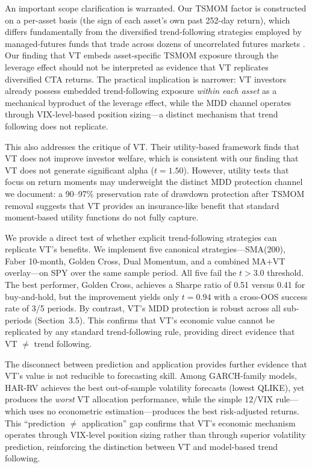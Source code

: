 \documentclass[12pt,a4paper]{article}
\begin{document}
An important scope clarification is warranted. Our TSMOM factor is constructed on a per-asset basis (the sign of each asset's own past 252-day return), which differs fundamentally from the diversified trend-following strategies employed by managed-futures funds that trade across dozens of uncorrelated futures markets \citep{moskowitz2012}. Our finding that VT embeds asset-specific TSMOM exposure through the leverage effect should not be interpreted as evidence that VT replicates diversified CTA returns. The practical implication is narrower: VT investors already possess embedded trend-following exposure \textit{within each asset} as a mechanical byproduct of the leverage effect, while the MDD channel operates through VIX-level-based position sizing---a distinct mechanism that trend following does not replicate.

This also addresses the \citet{cederburg2020} critique of VT. Their utility-based framework finds that VT does not improve investor welfare, which is consistent with our finding that VT does not generate significant alpha ($t = 1.50$). However, utility tests that focus on return moments may underweight the distinct MDD protection channel we document: a 90--97\% preservation rate of drawdown protection after TSMOM removal suggests that VT provides an insurance-like benefit that standard moment-based utility functions do not fully capture.

We provide a direct test of whether explicit trend-following strategies can replicate VT's benefits. We implement five canonical strategies---SMA(200), Faber 10-month, Golden Cross, Dual Momentum, and a combined MA+VT overlay---on SPY over the same sample period. All five fail the \citet{harvey2016} $t > 3.0$ threshold. The best performer, Golden Cross, achieves a Sharpe ratio of 0.51 versus 0.41 for buy-and-hold, but the improvement yields only $t = 0.94$ with a cross-OOS success rate of 3/5 periods. By contrast, VT's MDD protection is robust across all sub-periods (Section~3.5). This confirms that VT's economic value cannot be replicated by any standard trend-following rule, providing direct evidence that VT $\neq$ trend following.

The disconnect between prediction and application provides further evidence that VT's value is not reducible to forecasting skill. Among GARCH-family models, HAR-RV achieves the best out-of-sample volatility forecasts (lowest QLIKE), yet produces the \textit{worst} VT allocation performance, while the simple $12/\text{VIX}$ rule---which uses no econometric estimation---produces the best risk-adjusted returns. This ``prediction $\neq$ application'' gap confirms that VT's economic mechanism operates through VIX-level position sizing rather than through superior volatility prediction, reinforcing the distinction between VT and model-based trend following.
\end{document}
